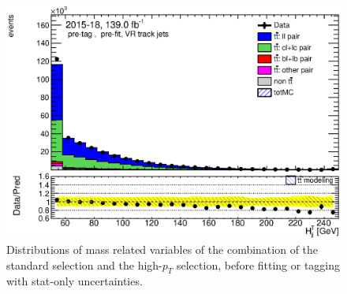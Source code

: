 \documentclass[letterpaper,12pt]{article}
\begin{document}
\begin{figure}
\begin{minipage}[b]{.45\textwidth}
	\end{minipage}\hfill
	\begin{minipage}[b]{.45\textwidth}
	\centering
	\includegraphics[width=1\textwidth]{Oct_distributions/pretagNoRwDL1rwithhighpTVRJets_scaledall/DataMC_Htjj.eps}
	\end{minipage}
	\caption{Distributions of mass related variables of the combination 
	of the standard selection and the high-$p_T$ selection, 
	before fitting or tagging with stat-only uncertainties.} \label{fig:mass_VRJets}
	\end{figure}
	
\end{document}
